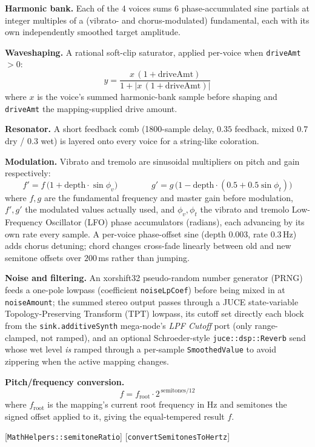 \documentclass[sigconf,nonacm]{acmart}
\newcommand{\coderef}[1]{{\small [#1]}}
\begin{document}
\textbf{Harmonic bank.} Each of the 4 voices sums 6 phase-accumulated sine partials at integer
multiples of a (vibrato- and chorus-modulated) fundamental, each with its own independently smoothed
target amplitude.

\textbf{Waveshaping.} A rational soft-clip saturator, applied per-voice when \texttt{driveAmt} $>0$:
\[
y = \frac{x\,(1+\text{driveAmt})}{1+\big|x\,(1+\text{driveAmt})\big|}
\]
where $x$ is the voice's summed harmonic-bank sample before shaping and \texttt{driveAmt} the
mapping-supplied drive amount.

\textbf{Resonator.} A short feedback comb (1800-sample delay, $0.35$ feedback, mixed $0.7$ dry /
$0.3$ wet) is layered onto every voice for a string-like coloration.

\textbf{Modulation.} Vibrato and tremolo are sinusoidal multipliers on pitch and gain respectively:
\[
f' = f\,\big(1+\text{depth}\cdot\sin\phi_v\big)
\qquad\qquad
g' = g\,\big(1-\text{depth}\cdot(0.5+0.5\sin\phi_t)\big)
\]
where $f, g$ are the fundamental frequency and master gain before modulation, $f', g'$ the modulated
values actually used, and $\phi_v, \phi_t$ the vibrato and tremolo Low-Frequency Oscillator (LFO)
phase accumulators (radians),
each advancing by its own rate every sample. A per-voice phase-offset sine (depth $0.003$, rate
$0.3$\,Hz) adds chorus detuning; chord changes cross-fade linearly between old and new semitone
offsets over $200$\,ms rather than jumping.

\textbf{Noise and filtering.} An xorshift32 pseudo-random number generator (PRNG) feeds a one-pole
lowpass (coefficient \texttt{noiseLpCoef}) before being mixed in at \texttt{noiseAmount}; the summed
stereo output passes through a JUCE state-variable Topology-Preserving Transform (TPT) lowpass, its
cutoff set directly each block from the \texttt{sink.additiveSynth} mega-node's \textit{LPF Cutoff}
port (only range-clamped, not ramped), and an optional Schroeder-style
\texttt{juce::dsp::Reverb} send whose wet level \emph{is} ramped through a per-sample
\texttt{SmoothedValue} to avoid zippering when the active mapping changes.

\textbf{Pitch/frequency conversion.}
\[
f = f_{\text{root}} \cdot 2^{\,\text{semitones}/12}
\]
where $f_{\text{root}}$ is the mapping's current root frequency in Hz and $\text{semitones}$ the
signed offset applied to it, giving the equal-tempered result $f$.
\begin{flushright}
\coderef{\texttt{MathHelpers::semitoneRatio}}
\coderef{\texttt{convertSemitonesToHertz}}
\end{flushright}
\end{document}
